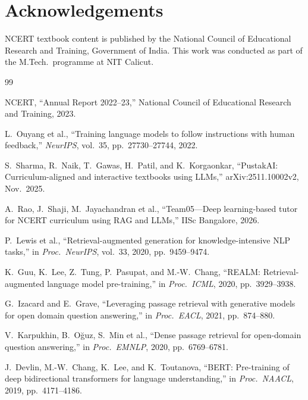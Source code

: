\documentclass[conference]{IEEEtran}
\begin{document}
\section*{Acknowledgements}
NCERT textbook content is published by the National Council of Educational Research and Training, Government of India. This work was conducted as part of the M.Tech.\ programme at NIT Calicut.

\begin{thebibliography}{99}

 NCERT, ``Annual Report 2022--23,'' National Council of Educational Research and Training, 2023.

 L.\ Ouyang et al., ``Training language models to follow instructions with human feedback,'' \emph{NeurIPS}, vol.~35, pp.~27730--27744, 2022.

 S.\ Sharma, R.\ Naik, T.\ Gawas, H.\ Patil, and K.\ Korgaonkar, ``PustakAI: Curriculum-aligned and interactive textbooks using LLMs,'' arXiv:2511.10002v2, Nov.\ 2025.

 A.\ Rao, J.\ Shaji, M.\ Jayachandran et al., ``Team05---Deep learning-based tutor for NCERT curriculum using RAG and LLMs,'' IISc Bangalore, 2026.

 P.\ Lewis et al., ``Retrieval-augmented generation for knowledge-intensive NLP tasks,'' in \emph{Proc.\ NeurIPS}, vol.~33, 2020, pp.~9459--9474.

 K.\ Guu, K.\ Lee, Z.\ Tung, P.\ Pasupat, and M.-W.\ Chang, ``REALM: Retrieval-augmented language model pre-training,'' in \emph{Proc.\ ICML}, 2020, pp.~3929--3938.

 G.\ Izacard and E.\ Grave, ``Leveraging passage retrieval with generative models for open domain question answering,'' in \emph{Proc.\ EACL}, 2021, pp.~874--880.

 V.\ Karpukhin, B.\ O\u{g}uz, S.\ Min et al., ``Dense passage retrieval for open-domain question answering,'' in \emph{Proc.\ EMNLP}, 2020, pp.~6769--6781.

 J.\ Devlin, M.-W.\ Chang, K.\ Lee, and K.\ Toutanova, ``BERT: Pre-training of deep bidirectional transformers for language understanding,'' in \emph{Proc.\ NAACL}, 2019, pp.~4171--4186.


\end{thebibliography}
\end{document}
